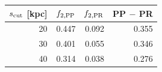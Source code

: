 \begin{tabular}{rrrr}\toprule
$s_{\rm cut}$ [kpc] & $f_{2,\rm PP}$ & $f_{2,\rm PR}$ & PP $-$ PR \\
\midrule
20 & 0.447 & 0.092 & 0.355 \\
30 & 0.401 & 0.055 & 0.346 \\
40 & 0.314 & 0.038 & 0.276 \\
\bottomrule\end{tabular}
